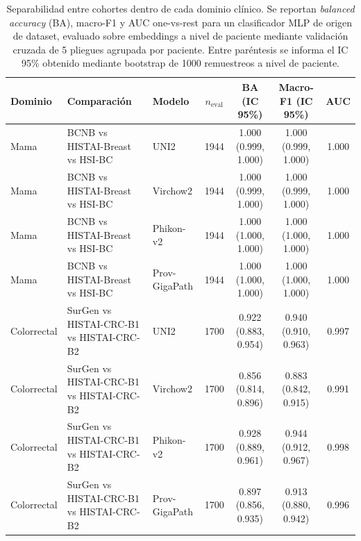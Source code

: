 \begin{table}[htbp]
\centering
\caption{Cuantificación del \textit{center effect}: exactitud balanceada (BA), macro-F1 y AUC (one-vs-rest) del clasificador MLP de origen de dataset (3 clases por dominio) sobre embeddings a nivel de paciente, con validación cruzada de 5 pliegues agrupada por paciente. Entre paréntesis, IC 95\% por bootstrap de 1000 remuestreos a nivel de paciente.}
\label{tab:anexo_center_effect_a}
\small
\begin{tabular}{lllcccc}
\toprule
Dominio & Comparación & Modelo & $n_{\text{eval}}$ & BA (IC 95\%) & Macro-F1 (IC 95\%) & AUC \\
\midrule
Mama & BCNB vs HISTAI-Breast vs HSI-BC & UNI2 & 1944 & 1.000 (0.999, 1.000) & 1.000 (0.999, 1.000) & 1.000 \\
Mama & BCNB vs HISTAI-Breast vs HSI-BC & Virchow2 & 1944 & 1.000 (0.999, 1.000) & 1.000 (0.999, 1.000) & 1.000 \\
Mama & BCNB vs HISTAI-Breast vs HSI-BC & Phikon-v2 & 1944 & 1.000 (1.000, 1.000) & 1.000 (1.000, 1.000) & 1.000 \\
Mama & BCNB vs HISTAI-Breast vs HSI-BC & Prov-GigaPath & 1944 & 1.000 (1.000, 1.000) & 1.000 (1.000, 1.000) & 1.000 \\
\midrule
Colorrectal & SurGen vs HISTAI-CRC-B1 vs HISTAI-CRC-B2 & UNI2 & 1700 & 0.922 (0.883, 0.954) & 0.940 (0.910, 0.963) & 0.997 \\
Colorrectal & SurGen vs HISTAI-CRC-B1 vs HISTAI-CRC-B2 & Virchow2 & 1700 & 0.856 (0.814, 0.896) & 0.883 (0.842, 0.915) & 0.991 \\
Colorrectal & SurGen vs HISTAI-CRC-B1 vs HISTAI-CRC-B2 & Phikon-v2 & 1700 & 0.928 (0.889, 0.961) & 0.944 (0.912, 0.967) & 0.998 \\
Colorrectal & SurGen vs HISTAI-CRC-B1 vs HISTAI-CRC-B2 & Prov-GigaPath & 1700 & 0.897 (0.856, 0.935) & 0.913 (0.880, 0.942) & 0.996 \\
\bottomrule
\end{tabular}
\caption{Separabilidad entre cohortes dentro de cada dominio clínico. Se reportan \textit{balanced accuracy} (BA), macro-F1 y AUC one-vs-rest para un clasificador MLP de origen de dataset, evaluado sobre embeddings a nivel de paciente mediante validación cruzada de 5 pliegues agrupada por paciente. Entre paréntesis se informa el IC 95\% obtenido mediante bootstrap de 1000 remuestreos a nivel de paciente.}
\end{table}


